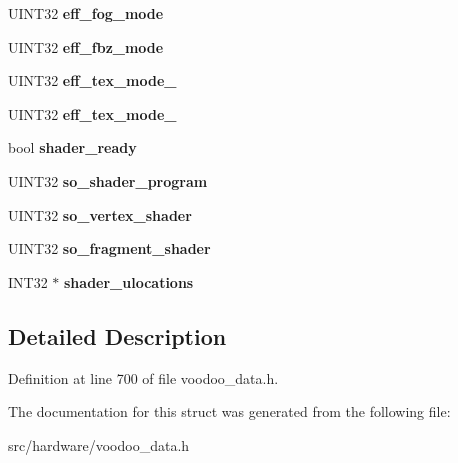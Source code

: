 \begin{DoxyCompactItemize}
\item 
\hypertarget{struct__raster__info_ad5d1026bf0cc5bdfe7e4a091c327afdb}{U\-I\-N\-T32 {\bfseries eff\-\_\-fog\-\_\-mode}}\label{struct__raster__info_ad5d1026bf0cc5bdfe7e4a091c327afdb}

\item 
\hypertarget{struct__raster__info_a08870fd7370927e4cab6cbef9184cb4f}{U\-I\-N\-T32 {\bfseries eff\-\_\-fbz\-\_\-mode}}\label{struct__raster__info_a08870fd7370927e4cab6cbef9184cb4f}

\item 
\hypertarget{struct__raster__info_ad1965927f9c3c4888ca80cd9ac439105}{U\-I\-N\-T32 {\bfseries eff\-\_\-tex\-\_\-mode\-\_}}\label{struct__raster__info_ad1965927f9c3c4888ca80cd9ac439105}

\item 
\hypertarget{struct__raster__info_acb15e44ddef2d6150173f5ae61eb945b}{U\-I\-N\-T32 {\bfseries eff\-\_\-tex\-\_\-mode\-\_}}\label{struct__raster__info_acb15e44ddef2d6150173f5ae61eb945b}

\item 
\hypertarget{struct__raster__info_a6c46fc6eb2c16a5693b51de1562e3d68}{bool {\bfseries shader\-\_\-ready}}\label{struct__raster__info_a6c46fc6eb2c16a5693b51de1562e3d68}

\item 
\hypertarget{struct__raster__info_a4cf2d94156a3d4a2cdff2ac3c4dfee1e}{U\-I\-N\-T32 {\bfseries so\-\_\-shader\-\_\-program}}\label{struct__raster__info_a4cf2d94156a3d4a2cdff2ac3c4dfee1e}

\item 
\hypertarget{struct__raster__info_aaa3d2c76a770b550d9d2b4239e45275f}{U\-I\-N\-T32 {\bfseries so\-\_\-vertex\-\_\-shader}}\label{struct__raster__info_aaa3d2c76a770b550d9d2b4239e45275f}

\item 
\hypertarget{struct__raster__info_a1f77e3342860812b6263a3cef2766dc0}{U\-I\-N\-T32 {\bfseries so\-\_\-fragment\-\_\-shader}}\label{struct__raster__info_a1f77e3342860812b6263a3cef2766dc0}

\item 
\hypertarget{struct__raster__info_ac29587f2f87117302f5a56363c3cb5a2}{I\-N\-T32 $\ast$ {\bfseries shader\-\_\-ulocations}}\label{struct__raster__info_ac29587f2f87117302f5a56363c3cb5a2}

\end{DoxyCompactItemize}


\subsection{Detailed Description}


Definition at line 700 of file voodoo\-\_\-data.\-h.



The documentation for this struct was generated from the following file\-:\begin{DoxyCompactItemize}
\item 
src/hardware/voodoo\-\_\-data.\-h\end{DoxyCompactItemize}
